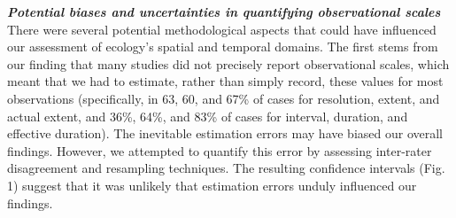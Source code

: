 \documentclass[12pt]{article}
\begin{document}
\noindent \textbf{\emph{Potential biases and uncertainties in quantifying observational scales}}\\

There were several potential methodological aspects that could have influenced our assessment of ecology's spatial and temporal domains. The first stems from our finding that many studies did not precisely report observational scales, which meant that we had to estimate, rather than simply record, these values for most observations (specifically, in 63, 60, and 67\% of cases for resolution, extent, and actual extent, and 36\%, 64\%, and 83\% of cases for interval, duration, and effective duration). The inevitable estimation errors may have biased our overall findings. However, we attempted to quantify this error by assessing inter-rater disagreement and resampling techniques. The resulting confidence intervals (Fig. 1) suggest that it was unlikely that estimation errors unduly influenced our findings. 
\end{document}

